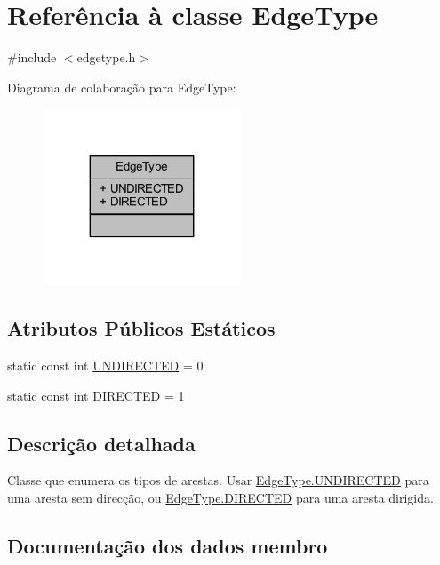 \hypertarget{class_edge_type}{}\section{Referência à classe Edge\+Type}
\label{class_edge_type}


{\ttfamily \#include $<$edgetype.\+h$>$}



Diagrama de colaboração para Edge\+Type\+:
\nopagebreak
\begin{figure}[H]
\begin{center}
\leavevmode
\includegraphics[width=167pt]{class_edge_type__coll__graph}
\end{center}
\end{figure}
\subsection*{Atributos Públicos Estáticos}
\begin{DoxyCompactItemize}
\item 
static const int \hyperlink{class_edge_type_a6533cc56d05c288a550b9980b66c9317}{U\+N\+D\+I\+R\+E\+C\+T\+E\+D} = 0
\item 
static const int \hyperlink{class_edge_type_a903017a534f2818c2d17145e4ae0321c}{D\+I\+R\+E\+C\+T\+E\+D} = 1
\end{DoxyCompactItemize}


\subsection{Descrição detalhada}
Classe que enumera os tipos de arestas. Usar \hyperlink{class_edge_type_a6533cc56d05c288a550b9980b66c9317}{Edge\+Type.\+U\+N\+D\+I\+R\+E\+C\+T\+E\+D} para uma aresta sem direcção, ou \hyperlink{class_edge_type_a903017a534f2818c2d17145e4ae0321c}{Edge\+Type.\+D\+I\+R\+E\+C\+T\+E\+D} para uma aresta dirigida. 

\subsection{Documentação dos dados membro}
\hypertarget{class_edge_type_a903017a534f2818c2d17145e4ae0321c}{}
